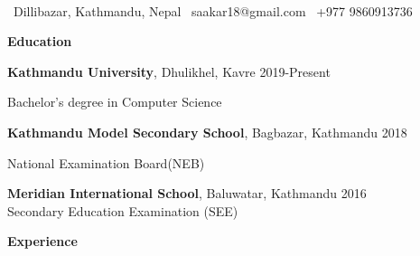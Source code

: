 \documentclass[11pt]{article}
\begin{document}
\begin{center}
     \\
    \hrulefill
\end{center}

\begin{center}
{\large \faMapMarker \ Dillibazar, Kathmandu, Nepal \hspace{6pt} \faEnvelope \ saakar18@gmail.com \hspace{5pt} \faPhone \ +977 9860913736}

\end{center}

\vspace{0.5pt}

\begin{center}
    {\huge \textbf{Education}}
\end{center}
\vspace{-15pt}
        \hrulefill

\textbf{Kathmandu University}, Dhulikhel, Kavre \hfill 2019-Present

Bachelor's degree in Computer Science



\vspace{12pt}

\textbf{Kathmandu Model Secondary School}\hspace{1mm}, Bagbazar, Kathmandu \hfill 2018



National Examination Board(NEB)

\vspace{12pt}

\textbf{Meridian International School}, Baluwatar, Kathmandu \hfill	2016
\\
Secondary Education Examination (SEE)

\vspace{12pt}

\begin{center}
    {\Huge\textbf{Experience}}
\end{center}
\vspace{-15pt}

        \hrulefill

\end{document}
